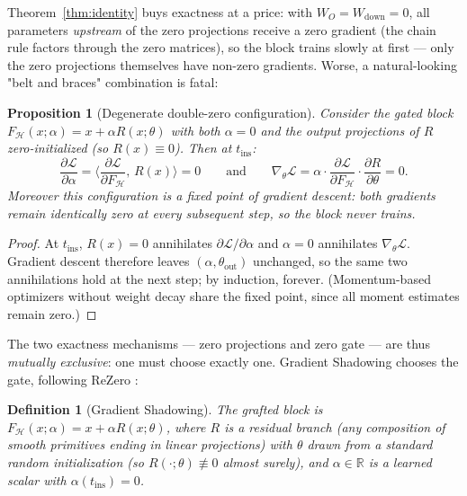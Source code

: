 \documentclass[11pt,a4paper]{article}
\newtheorem{definition}{Definition}
\newtheorem{proposition}{Proposition}
\newcommand{\Hb}{\mathcal{H}}
\newcommand{\Loss}{\mathcal{L}}
\begin{document}
Theorem~\ref{thm:identity} buys exactness at a price: with $W_O = W_{\mathrm{down}} = 0$, all parameters \emph{upstream} of the zero projections receive a zero gradient (the chain rule factors through the zero matrices), so the block trains slowly at first --- only the zero projections themselves have non-zero gradients. Worse, a natural-looking "belt and braces" combination is fatal:

\begin{proposition}[Degenerate double-zero configuration]
\label{prop:saddle}
Consider the gated block $F_{\Hb}(x; \alpha) = x + \alpha R(x; \theta)$ with \emph{both} $\alpha = 0$ and the output projections of $R$ zero-initialized (so $R(x) \equiv 0$). Then at $t_{\mathrm{ins}}$:
\[
\frac{\partial \Loss}{\partial \alpha} = \Big\langle \frac{\partial \Loss}{\partial F_{\Hb}},\, R(x) \Big\rangle = 0
\qquad \text{and} \qquad
\nabla_{\theta} \Loss = \alpha \cdot \frac{\partial \Loss}{\partial F_{\Hb}} \cdot \frac{\partial R}{\partial \theta} = 0 .
\]
Moreover this configuration is a fixed point of gradient descent: both gradients remain identically zero at every subsequent step, so the block never trains.
\end{proposition}

\begin{proof}
At $t_{\mathrm{ins}}$, $R(x) = 0$ annihilates $\partial \Loss / \partial \alpha$ and $\alpha = 0$ annihilates $\nabla_\theta \Loss$. Gradient descent therefore leaves $(\alpha, \theta_{\mathrm{out}})$ unchanged, so the same two annihilations hold at the next step; by induction, forever. (Momentum-based optimizers without weight decay share the fixed point, since all moment estimates remain zero.)
\end{proof}

The two exactness mechanisms --- zero projections and zero gate --- are thus \emph{mutually exclusive}: one must choose exactly one. Gradient Shadowing chooses the gate, following ReZero \cite{rezero}:

\begin{definition}[Gradient Shadowing]
The grafted block is $F_{\Hb}(x; \alpha) = x + \alpha R(x; \theta)$, where $R$ is a residual branch (any composition of smooth primitives ending in linear projections) with $\theta$ drawn from a standard random initialization (so $R(\cdot;\theta) \not\equiv 0$ almost surely), and $\alpha \in \mathbb{R}$ is a learned scalar with $\alpha(t_{\mathrm{ins}}) = 0$.
\end{definition}
\end{document}
